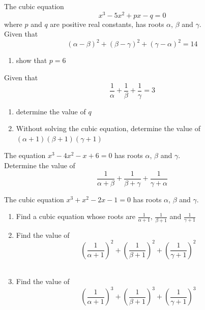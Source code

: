 \documentclass[leqno]{article}
\begin{document}
\begin{enumerate}[
  label=\textbf{\arabic*.},
  leftmargin=*,
  topsep=0pt,
  partopsep=0pt,
  parsep=0pt
]
\newpage

\questionitem

The cubic equation
\[
x^3 - 5x^2 + px - q = 0
\]
where $p$ and $q$ are positive real constants, has roots $\alpha$, $\beta$ and $\gamma$. \\

Given that
\[
(\alpha-\beta)^2 + (\beta-\gamma)^2 + (\gamma-\alpha)^2 = 14
\]
\begin{enumerate}[label=\textbf{(\alph*)}]
  \item show that $p=6$  \\
\end{enumerate}
Given that
\[
\frac{1}{\alpha} + \frac{1}{\beta} + \frac{1}{\gamma} = 3
\]
\begin{enumerate}[label=\textbf{(\alph*)}, resume]
  \item determine the value of $q$  \\
  \item Without solving the cubic equation, determine the value of $(\alpha+1)(\beta+1)(\gamma+1)$  \\
\end{enumerate}

\newpage

\questionitem

The equation $x^3 - 4x^2 - x + 6 = 0$ has roots $\alpha$, $\beta$ and $\gamma$. \\

Determine the value of \[\frac{1}{\alpha+\beta} + \frac{1}{\beta+\gamma} + \frac{1}{\gamma+\alpha}\] 

\newpage

\questionitem

The cubic equation $x^3 + x^2 - 2x - 1 = 0$ has roots $\alpha$, $\beta$ and $\gamma$. \\

\begin{enumerate}[label=\textbf{(\alph*)}]
  \item Find a cubic equation whose roots are $\frac{1}{\alpha+1}$, $\frac{1}{\beta+1}$ and $\frac{1}{\gamma+1}$  \\
  \item Find the value of \[\left(\frac{1}{\alpha+1}\right)^2 + \left(\frac{1}{\beta+1}\right)^2 + \left(\frac{1}{\gamma+1}\right)^2\]  \\
  \item Find the value of \[\left(\frac{1}{\alpha+1}\right)^3 + \left(\frac{1}{\beta+1}\right)^3 + \left(\frac{1}{\gamma+1}\right)^3\]  \\
\end{enumerate}


\end{enumerate}
\end{document}
